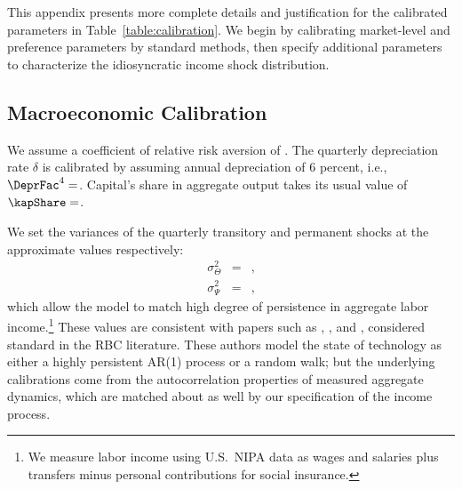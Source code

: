 This appendix presents more complete details and justification for the calibrated parameters in Table~\ref{table:calibration}.  We begin by calibrating market-level and preference parameters by standard methods, then specify additional parameters to characterize the idiosyncratic income shock distribution.

\subsection{Macroeconomic Calibration}
\label{sec:MacroCal}

We assume a coefficient of relative risk aversion of
$

$. %
The quarterly depreciation rate $\delta$ is calibrated by assuming annual depreciation of 6 percent,
i.e.,
$
\DeprFac^{4}= 
$.  Capital's share in aggregate output takes its usual value of
$
\kapShare= 
$.

We set the variances of the quarterly transitory and permanent shocks at the approximate values respectively:
\begin{eqnarray*}
	\sigma^{2}_{\Theta} & = &  ,
	\\ \sigma^{2}_{\Psi}  & =  &  ,
\end{eqnarray*}
which allow the model to match high degree of persistence in aggregate labor income.\footnote{We measure labor income using U.S.\ NIPA data as wages and salaries plus transfers minus personal contributions for social insurance.} These values are consistent with papers such as \cite{jermannProduction}, \cite{bcfHabits}, and \cite{ckmCritique}, considered standard  in the RBC literature. These authors model the state of technology as either a highly persistent AR(1) process or a random walk; but the underlying calibrations come from the autocorrelation properties of measured aggregate dynamics, which are matched about as well by our specification of the income process.

